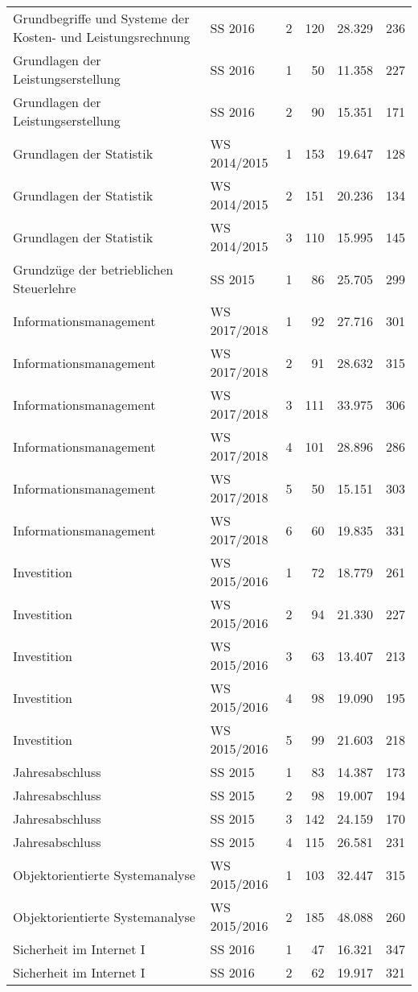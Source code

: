 \begin{longtable}{lllrrr}
Grundbegriffe und Systeme der Kosten- und Leistungsrechnung & SS 2016 & 2 & 120 & 28.329 & 236\\
Grundlagen der Leistungserstellung & SS 2016 & 1 & 50 & 11.358 & 227\\
Grundlagen der Leistungserstellung & SS 2016 & 2 & 90 & 15.351 & 171\\
Grundlagen der Statistik & WS 2014/2015 & 1 & 153 & 19.647 & 128\\
Grundlagen der Statistik & WS 2014/2015 & 2 & 151 & 20.236 & 134\\
Grundlagen der Statistik & WS 2014/2015 & 3 & 110 & 15.995 & 145\\
Grundzüge der betrieblichen Steuerlehre & SS 2015 & 1 & 86 & 25.705 & 299\\
Informationsmanagement & WS 2017/2018 & 1 & 92 & 27.716 & 301\\
Informationsmanagement & WS 2017/2018 & 2 & 91 & 28.632 & 315\\
Informationsmanagement & WS 2017/2018 & 3 & 111 & 33.975 & 306\\
Informationsmanagement & WS 2017/2018 & 4 & 101 & 28.896 & 286\\
Informationsmanagement & WS 2017/2018 & 5 & 50 & 15.151 & 303\\
Informationsmanagement & WS 2017/2018 & 6 & 60 & 19.835 & 331\\
Investition & WS 2015/2016 & 1 & 72 & 18.779 & 261\\
Investition & WS 2015/2016 & 2 & 94 & 21.330 & 227\\
Investition & WS 2015/2016 & 3 & 63 & 13.407 & 213\\
Investition & WS 2015/2016 & 4 & 98 & 19.090 & 195\\
Investition & WS 2015/2016 & 5 & 99 & 21.603 & 218\\
Jahresabschluss & SS 2015 & 1 & 83 & 14.387 & 173\\
Jahresabschluss & SS 2015 & 2 & 98 & 19.007 & 194\\
Jahresabschluss & SS 2015 & 3 & 142 & 24.159 & 170\\
Jahresabschluss & SS 2015 & 4 & 115 & 26.581 & 231\\
Objektorientierte Systemanalyse & WS 2015/2016 & 1 & 103 & 32.447 & 315\\
Objektorientierte Systemanalyse & WS 2015/2016 & 2 & 185 & 48.088 & 260\\
Sicherheit im Internet I & SS 2016 & 1 & 47 & 16.321 & 347\\
Sicherheit im Internet I & SS 2016 & 2 & 62 & 19.917 & 321\\

\end{longtable}
